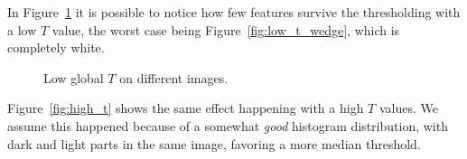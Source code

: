 \documentclass[conference]{IEEEtran}
\begin{document}
In Figure~\ref{fig:low_t} it is possible to notice how few features survive the thresholding with a low $T$ value, the worst case being Figure~\ref{fig:low_t_wedge}, which is completely white.
\begin{figure}[htbp]
	\centering
	\quad
	\caption{Low global $T$ on different images.}
	\label{fig:low_t}
\end{figure}
Figure~\ref{fig:high_t} shows the same effect happening with a high $T$ values. We assume this happened because of a somewhat \textit{good} histogram distribution, with dark and light parts in the same image, favoring a more median threshold.
\end{document}
